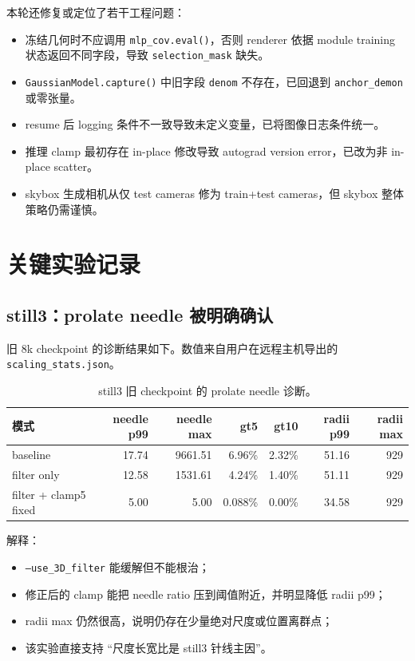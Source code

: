\documentclass[11pt,a4paper]{article}
\begin{document}
本轮还修复或定位了若干工程问题：
\begin{itemize}[leftmargin=1.5em]
  \item 冻结几何时不应调用 \texttt{mlp\_cov.eval()}，否则 renderer 依据 module training 状态返回不同字段，导致 \texttt{selection\_mask} 缺失。
  \item \texttt{GaussianModel.capture()} 中旧字段 \texttt{denom} 不存在，已回退到 \texttt{anchor\_demon} 或零张量。
  \item resume 后 logging 条件不一致导致未定义变量，已将图像日志条件统一。
  \item 推理 clamp 最初存在 in-place 修改导致 autograd version error，已改为非 in-place scatter。
  \item skybox 生成相机从仅 test cameras 修为 train+test cameras，但 skybox 整体策略仍需谨慎。
\end{itemize}

\section{关键实验记录}

\subsection{still3：prolate needle 被明确确认}

旧 8k checkpoint 的诊断结果如下。数值来自用户在远程主机导出的 \texttt{scaling\_stats.json}。

\begin{table}[h]
\centering
\begin{tabular}{lrrrrrr}
\toprule
模式 & needle p99 & needle max & gt5 & gt10 & radii p99 & radii max \\
\midrule
baseline & 17.74 & 9661.51 & 6.96\% & 2.32\% & 51.16 & 929 \\
filter only & 12.58 & 1531.61 & 4.24\% & 1.40\% & 51.11 & 929 \\
filter + clamp5 fixed & 5.00 & 5.00 & 0.088\% & 0.00\% & 34.58 & 929 \\
\bottomrule
\end{tabular}
\caption{still3 旧 checkpoint 的 prolate needle 诊断。}
\end{table}

解释：
\begin{itemize}[leftmargin=1.5em]
  \item \texttt{--use\_3D\_filter} 能缓解但不能根治；
  \item 修正后的 clamp 能把 needle ratio 压到阈值附近，并明显降低 radii p99；
  \item radii max 仍然很高，说明仍存在少量绝对尺度或位置离群点；
  \item 该实验直接支持 ``尺度长宽比是 still3 针线主因''。
\end{itemize}
\end{document}

